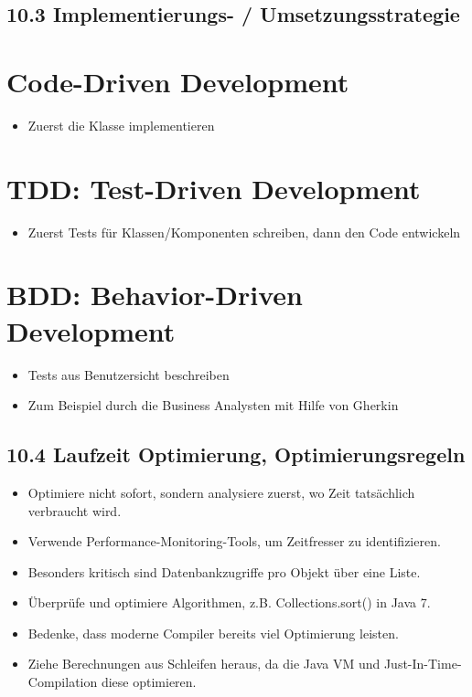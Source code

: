 \subsection*{10.3 Implementierungs- / Umsetzungsstrategie}
\section*{Code-Driven Development}
\begin{itemize}
  \item Zuerst die Klasse implementieren
\end{itemize}

\section*{TDD: Test-Driven Development}
\begin{itemize}
  \item Zuerst Tests für Klassen/Komponenten schreiben, dann den Code entwickeln
\end{itemize}

\section*{BDD: Behavior-Driven Development}
\begin{itemize}
  \item Tests aus Benutzersicht beschreiben
  \item Zum Beispiel durch die Business Analysten mit Hilfe von Gherkin
\end{itemize}

\subsection*{10.4 Laufzeit Optimierung, Optimierungsregeln}
\begin{itemize}
  \item Optimiere nicht sofort, sondern analysiere zuerst, wo Zeit tatsächlich verbraucht wird.
  \item Verwende Performance-Monitoring-Tools, um Zeitfresser zu identifizieren.
  \item Besonders kritisch sind Datenbankzugriffe pro Objekt über eine Liste.
  \item Überprüfe und optimiere Algorithmen, z.B. Collections.sort() in Java 7.
  \item Bedenke, dass moderne Compiler bereits viel Optimierung leisten.
  \item Ziehe Berechnungen aus Schleifen heraus, da die Java VM und Just-In-Time-Compilation diese optimieren.
\end{itemize}

